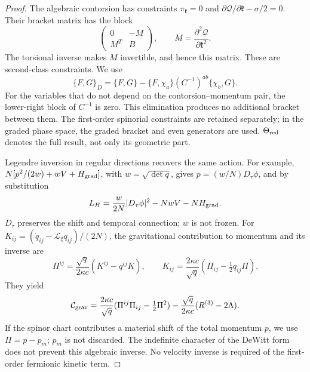 \begin{proof}
The algebraic contorsion has constraints \(\pi_{\mathfrak k}=0\) and \(\partial\mathcal Q/\partial\mathfrak k-\sigma/2=0\). Their bracket matrix has the block
\[
 \begin{pmatrix}0&-M\\ M^T&B\end{pmatrix},
 \qquad M=\frac{\partial^2\mathcal Q}{\partial\mathfrak k^2}.
\]
The torsional inverse makes \(M\) invertible, and hence this matrix. These are second-class constraints. We use
\begin{equation}
 \{F,G\}_D=\{F,G\}
       -\{F,\chi_a\}(C^{-1})^{ab}\{\chi_b,G\}.
 \label{hmtcuatro:corchete-dirac}
\end{equation}
For the variables that do not depend on the contorsion--momentum pair, the lower-right block of \(C^{-1}\) is zero. This elimination produces no additional bracket between them. The first-order spinorial constraints are retained separately; in the graded phase space, the graded bracket and even generators are used. \(\Theta_{\rm red}\) denotes the full result, not only its geometric part.

Legendre inversion in regular directions recovers the same action. For example, \(N[p^2/(2w)+wV+H_{\rm grad}]\), with \(w=\sqrt{\det q}\), gives \(p=(w/N)D_\tau\phi\), and by substitution
\[
 L_H=\frac{w}{2N}|D_\tau\phi|^2-NwV-NH_{\rm grad}.
\]
\(D_\tau\) preserves the shift and temporal connection; \(w\) is not frozen. For \(K_{ij}=(\dot q_{ij}-\mathcal L_\xi q_{ij})/(2N)\), the gravitational contribution to momentum and its inverse are
\begin{equation}
 \Pi^{ij}=\frac{\sqrt q}{2\kappa c}(K^{ij}-q^{ij}K),\qquad
 K_{ij}=\frac{2\kappa c}{\sqrt q}
                  (\Pi_{ij}-\tfrac12q_{ij}\Pi).
 \label{hmtcuatro:legendre-geometrica}
\end{equation}
They yield
\[
 \mathcal C_{\rm grav}
 =\frac{2\kappa c}{\sqrt q}
       (\Pi^{ij}\Pi_{ij}-\tfrac12\Pi^2)
  -\frac{\sqrt q}{2\kappa c}(R^{(3)}-2\Lambda).
\]
If the spinor chart contributes a material shift of the total momentum \(p\), we use \(\Pi=p-p_m\); \(p_m\) is not discarded. The indefinite character of the DeWitt form does not prevent this algebraic inverse. No velocity inverse is required of the first-order fermionic kinetic term.


\end{proof}

